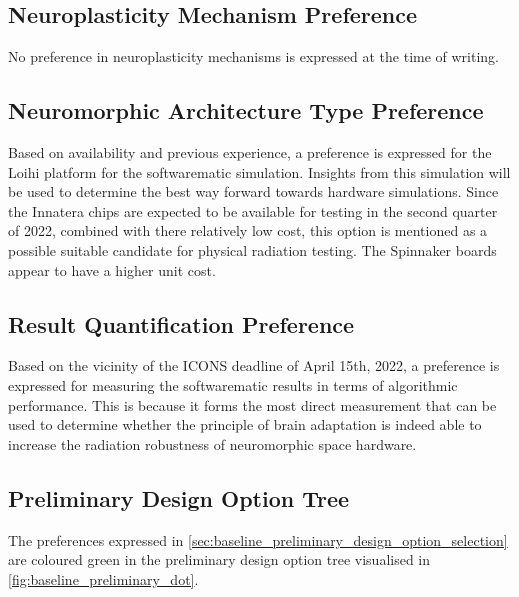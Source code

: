 \subsection{Neuroplasticity Mechanism Preference}\label{subsec:baseline_neuroplasticity_mechanism_preference}
No preference in neuroplasticity mechanisms is expressed at the time of writing.

\subsection{Neuromorphic Architecture Type Preference}\label{subsec:baseline_neuromorphic_architecture_preference}
Based on availability and previous experience, a preference is expressed for the Loihi platform for the softwarematic simulation. Insights from this simulation will be used to determine the best way forward towards hardware simulations. Since the Innatera chips are expected to be available for testing in the second quarter of 2022, combined with there relatively low cost, this option is mentioned as a possible suitable candidate for physical radiation testing. The Spinnaker boards appear to have a higher unit cost.

\subsection{Result Quantification Preference}\label{subsec:baseline_result_quantification_preference}
Based on the vicinity of the ICONS deadline of April 15th, 2022, a preference is expressed for measuring the softwarematic results in terms of algorithmic performance. This is because it forms the most direct measurement that can be used to determine whether the principle of brain adaptation is indeed able to increase the radiation robustness of neuromorphic space hardware.

\subsection{Preliminary Design Option Tree}\label{subsec:preliminary_design_option_tree}
The preferences expressed in \cref{sec:baseline_preliminary_design_option_selection} are coloured green in the preliminary design option tree visualised in \cref{fig:baseline_preliminary_dot}.


